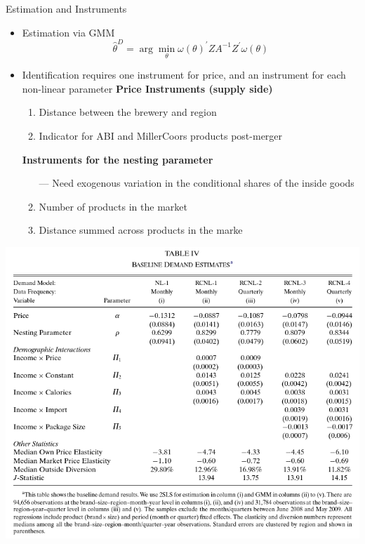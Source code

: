\documentclass[dvipsnames]{beamer}
\begin{document}
\begin{frame}{Estimation and Instruments}
  \begin{itemize}
  \item Estimation via GMM
    \[
\hat{\theta}^D = \arg \min_\theta \omega(\theta)^\prime Z A^{-1}Z^\prime \omega (\theta)
    \]
    \item Identification requires one instrument for price, and an instrument for each non-linear parameter
    \vitem \textbf{Price Instruments (supply side)}
    \begin{enumerate}
    \item Distance between the brewery and region
      \item Indicator for ABI and MillerCoors products post-merger
    \end{enumerate}
    \vitem \textbf{Instruments for the nesting parameter}
    \begin{enumerate}
      \item[---] Need exogenous variation in the conditional shares of the inside goods
    \item Number of products in the market
      \item Distance summed across products in the marke
    \end{enumerate}
  \end{itemize}
\end{frame}
%
\begin{frame}{}
  \begin{center}
    \vspace{-1em}
    \includegraphics[height=\textheight, keepaspectratio=true]{tab4.png}
  \end{center}
\end{frame}
\end{document}
